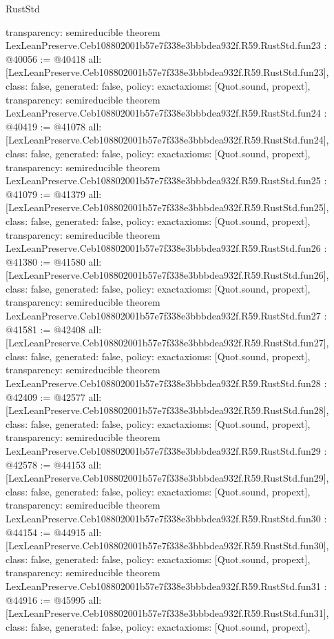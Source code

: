 \begin{lexlean}{RustStd}
\begin{coremodule}
{  transparency: semireducible
}
theorem LexLeanPreserve.Ceb108802001b57e7f338e3bbbdea932f.R59.RustStd.fun23 : @40056 := @40418 {
  all: [LexLeanPreserve.Ceb108802001b57e7f338e3bbbdea932f.R59.RustStd.fun23],
  class: false,
  generated: false,
  policy: exact{axioms: [Quot.sound, propext]},
  transparency: semireducible
}
theorem LexLeanPreserve.Ceb108802001b57e7f338e3bbbdea932f.R59.RustStd.fun24 : @40419 := @41078 {
  all: [LexLeanPreserve.Ceb108802001b57e7f338e3bbbdea932f.R59.RustStd.fun24],
  class: false,
  generated: false,
  policy: exact{axioms: [Quot.sound, propext]},
  transparency: semireducible
}
theorem LexLeanPreserve.Ceb108802001b57e7f338e3bbbdea932f.R59.RustStd.fun25 : @41079 := @41379 {
  all: [LexLeanPreserve.Ceb108802001b57e7f338e3bbbdea932f.R59.RustStd.fun25],
  class: false,
  generated: false,
  policy: exact{axioms: [Quot.sound, propext]},
  transparency: semireducible
}
theorem LexLeanPreserve.Ceb108802001b57e7f338e3bbbdea932f.R59.RustStd.fun26 : @41380 := @41580 {
  all: [LexLeanPreserve.Ceb108802001b57e7f338e3bbbdea932f.R59.RustStd.fun26],
  class: false,
  generated: false,
  policy: exact{axioms: [Quot.sound, propext]},
  transparency: semireducible
}
theorem LexLeanPreserve.Ceb108802001b57e7f338e3bbbdea932f.R59.RustStd.fun27 : @41581 := @42408 {
  all: [LexLeanPreserve.Ceb108802001b57e7f338e3bbbdea932f.R59.RustStd.fun27],
  class: false,
  generated: false,
  policy: exact{axioms: [Quot.sound, propext]},
  transparency: semireducible
}
theorem LexLeanPreserve.Ceb108802001b57e7f338e3bbbdea932f.R59.RustStd.fun28 : @42409 := @42577 {
  all: [LexLeanPreserve.Ceb108802001b57e7f338e3bbbdea932f.R59.RustStd.fun28],
  class: false,
  generated: false,
  policy: exact{axioms: [Quot.sound, propext]},
  transparency: semireducible
}
theorem LexLeanPreserve.Ceb108802001b57e7f338e3bbbdea932f.R59.RustStd.fun29 : @42578 := @44153 {
  all: [LexLeanPreserve.Ceb108802001b57e7f338e3bbbdea932f.R59.RustStd.fun29],
  class: false,
  generated: false,
  policy: exact{axioms: [Quot.sound, propext]},
  transparency: semireducible
}
theorem LexLeanPreserve.Ceb108802001b57e7f338e3bbbdea932f.R59.RustStd.fun30 : @44154 := @44915 {
  all: [LexLeanPreserve.Ceb108802001b57e7f338e3bbbdea932f.R59.RustStd.fun30],
  class: false,
  generated: false,
  policy: exact{axioms: [Quot.sound, propext]},
  transparency: semireducible
}
theorem LexLeanPreserve.Ceb108802001b57e7f338e3bbbdea932f.R59.RustStd.fun31 : @44916 := @45995 {
  all: [LexLeanPreserve.Ceb108802001b57e7f338e3bbbdea932f.R59.RustStd.fun31],
  class: false,
  generated: false,
  policy: exact{axioms: [Quot.sound, propext]},
}
\end{coremodule}
\end{lexlean}

